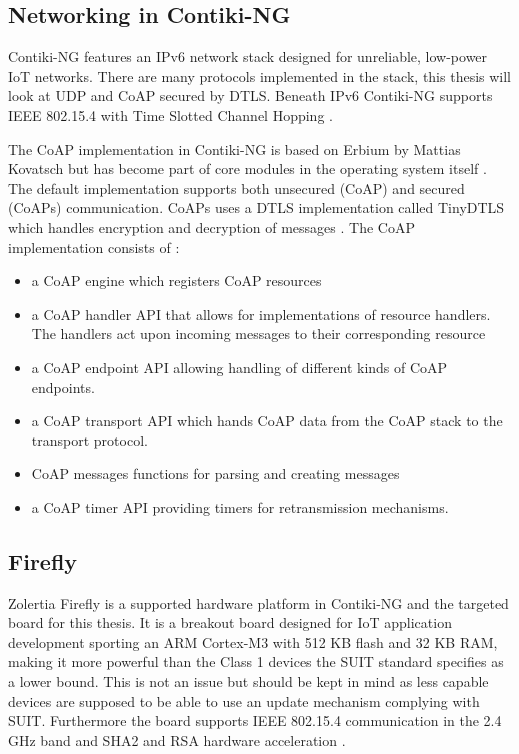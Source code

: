\documentclass[0-thesis.tex]{subfiles}
\begin{document}
\subsection{Networking in Contiki-NG}
\label{ssec:networking-contiki}
Contiki-NG features an IPv6 network stack designed for unreliable, low-power IoT networks.
There are many protocols implemented in the stack, this thesis will look at UDP and CoAP
secured by DTLS. Beneath IPv6 Contiki-NG supports IEEE 802.15.4 with Time Slotted Channel
Hopping \parencite{ieee-802.15.4}.

The CoAP implementation in Contiki-NG is based on Erbium by Mattias Kovatsch but has
become part of core modules in the operating system itself \parencite{low-power-coap}. The
default implementation supports both unsecured (CoAP) and secured (CoAPs) communication.
CoAPs uses a DTLS implementation called TinyDTLS which handles encryption and decryption
of messages \parencite{tinydtls-github}. The CoAP implementation consists of
\parencite{contiki-coap}: 

\begin{itemize}
    \item a CoAP engine which registers CoAP resources
    \item a CoAP handler API that allows for implementations of resource handlers. The
        handlers act upon incoming messages to their corresponding resource
    \item a CoAP endpoint API allowing handling of different kinds of CoAP endpoints.
    \item a CoAP transport API which hands CoAP data from the CoAP stack to the transport
    protocol.
    \item CoAP messages functions for parsing and creating messages
    \item a CoAP timer API providing timers for retransmission mechanisms.    
\end{itemize}

\subsection{Firefly}
\label{ssec:firefly}
Zolertia Firefly is a supported hardware platform in Contiki-NG and the targeted board for
this thesis. It is a breakout board designed for IoT application development sporting an
ARM Cortex-M3 with 512 KB flash and 32 KB RAM, making it more powerful than the Class 1
devices the SUIT standard specifies as a lower bound. This is not an issue but should be
kept in mind as less capable devices are supposed to be able to use an update mechanism
complying with SUIT. Furthermore the board supports IEEE 802.15.4 communication in the 2.4
GHz band and SHA2 and RSA hardware acceleration \parencite{firefly-datasheet}.
\end{document}
